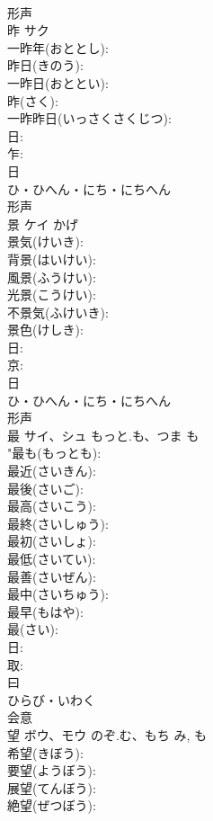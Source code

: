 \documentclass[8pt]{extreport}
\begin{document}
\begin{CJK}{UTF8}{min}
\\	形声 
\\	昨	サク			
\\	一昨年(おととし): 
\\	昨日(きのう): 
\\	一昨日(おととい): 
\\	昨(さく): 
\\	一昨昨日(いっさくさくじつ): 
\\	日: 
\\	乍: 
\\	日	
\\	ひ・ひへん・にち・にちへん	
\\	形声 
\\	景	ケイ		かげ	
\\	景気(けいき): 
\\	背景(はいけい): 
\\	風景(ふうけい): 
\\	光景(こうけい): 
\\	不景気(ふけいき): 
\\	景色(けしき): 
\\	日: 
\\	京: 
\\	日	
\\	ひ・ひへん・にち・にちへん	
\\	形声 
\\	最	サイ、シュ	もっと.も、つま	も	
\\	"最も(もっとも): 
\\	最近(さいきん): 
\\	最後(さいご): 
\\	最高(さいこう): 
\\	最終(さいしゅう): 
\\	最初(さいしょ): 
\\	最低(さいてい): 
\\	最善(さいぜん): 
\\	最中(さいちゅう): 
\\	最早(もはや): 
\\	最(さい): 
\\	日: 
\\	取: 
\\	曰	
\\	ひらび・いわく	
\\	会意 
\\	望	ボウ、モウ	のぞ.む、もち	み, も	
\\	希望(きぼう): 
\\	要望(ようぼう): 
\\	展望(てんぼう): 
\\	絶望(ぜつぼう): 

\end{CJK}
\end{document}
